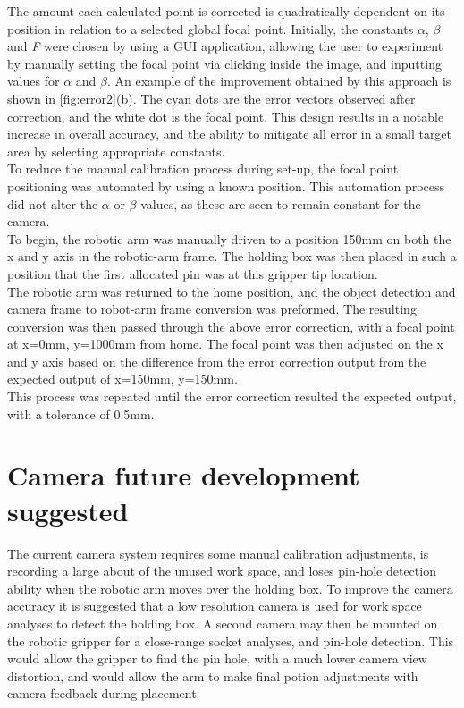\documentclass[11pt,a4paper, margin=1in]{report}
\begin{document}
The amount each calculated point is corrected is quadratically dependent on its position in relation to a selected global focal point. Initially, the constants $\alpha$, $\beta$ and \textit{F} were chosen by using a GUI application, allowing the user to experiment by manually setting the focal point via clicking inside the image, and inputting values for $\alpha$ and $\beta$. An example of the improvement obtained by this approach is shown in \cref{fig:error2}(b). The cyan dots are the error vectors observed after correction, and the white dot is the focal point. This design results in a notable increase in overall accuracy, and the ability to mitigate all error in a small target area by selecting appropriate constants.\\

To reduce the manual calibration process during set-up, the focal point positioning was automated by using a known position. This automation process did not alter the $\alpha$ or $\beta$ values, as these are seen to remain constant for the camera.\\
To begin, the robotic arm was manually driven to a position 150mm on both the x and y axis in the robotic-arm frame. The holding box was then placed in such a position that the first allocated pin was at this gripper tip location.\\
The robotic arm was returned to the home position, and the object detection and camera frame to robot-arm frame conversion was preformed. The resulting conversion was then passed through the above error correction, with a focal point at x=0mm, y=1000mm from home. The focal point was then adjusted on the x and y axis based on the difference from the error correction output from the expected output of x=150mm, y=150mm.\\
This process was repeated until the error correction resulted the expected output, with a tolerance of 0.5mm.   

\section{Camera future development suggested}
The current camera system requires some manual calibration adjustments, is recording a large about of the unused work space, and loses pin-hole detection ability when the robotic arm moves over the holding box. To improve the camera accuracy it is suggested that a low resolution camera is used for work space analyses to detect the holding box. A second camera may then be mounted on the robotic gripper for a close-range socket analyses, and pin-hole detection. This would allow the gripper to find the pin hole, with a much lower camera view distortion, and would allow the arm to make final potion adjustments with camera feedback during placement. 
\end{document}
